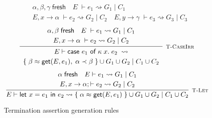 \begin{figure}
\[{\begin{array}{c}
            \end{array}
        }{
            \begin{array}{c}
                \alpha, \beta, \gamma\; \textsf{fresh}
                \hspace{1em}
                E\; \vdash e_1 \rightsquigarrow G_1\; |\; C_1 \\[2.5pt]
                E, x \rightarrow \alpha\; \vdash e_2 \rightsquigarrow G_2\; |\; C_2
                \hspace{1em}
                E, y \rightarrow \gamma\; \vdash e_3 \rightsquigarrow G_3\; |\; C_3
            \end{array}
        }
    \]
    \vspace{10pt}
    \[
        \infer[\textsc{\footnotesize T-CaseIrr}]{
            \begin{array}{c}
                E \vdash \textsf{case } e_1 \textsf{ of } \kappa\; x.\; e_2\; 
                \rightsquigarrow \\[2.5pt]
                \{\; \beta \teq \textsf{get}(E, e_1),\; \alpha \tlt \beta\; \} \cup G_1 \cup G_2\; |\; C_1 \cup C_2
            \end{array}
        }{
            \begin{array}{c}
                \alpha, \beta\; \textsf{fresh}
                \hspace{1em}
                E\; \vdash e_1 
                    \rightsquigarrow G_1\; |\; C_1 \\[2.5pt]
                E, x \rightarrow \alpha\; 
                    \vdash e_2 \rightsquigarrow G_2\; |\; C_2
            \end{array}
        }
    \]
    \vspace{10pt}
    \[
        \infer[\textsc{\footnotesize T-Let}]{
            E \vdash \textsf{let } x = e_1 \textsf{ in } e_2
                \rightsquigarrow \{\; \alpha \teq \textsf{get}(E, e_1)\; \} \cup G_1 \cup G_2\; |\; C_1 \cup C_2
        }{
            \begin{array}{c}
                \alpha \; \textsf{fresh}
                \hspace{1em}
                E \vdash e_1 \rightsquigarrow G_1\; |\; C_1 \\[2.5pt]
                E, x \rightarrow \alpha; \vdash e_2 
                    \rightsquigarrow G_2\; |\; C_2
            \end{array}
        }
    \]
    \caption{Termination assertion generation rules}
    \label{fig:terminationassertiongen}
\end{figure}


